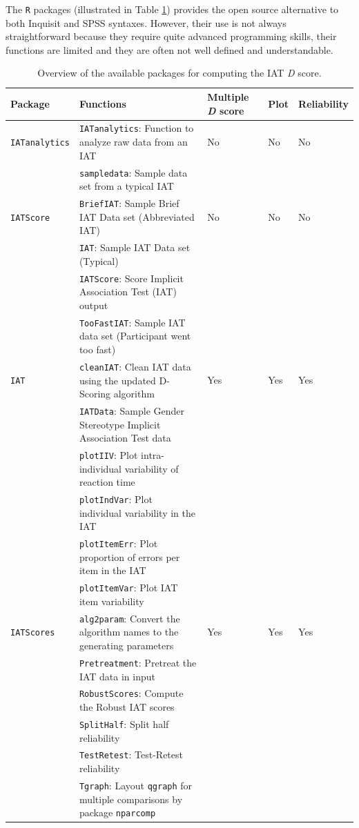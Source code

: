 \documentclass[12pt]{book}
\begin{document}
The \verb*|R| packages (illustrated in Table \ref{tab:dscorepkg}) provides the open source alternative to both Inquisit and SPSS syntaxes.  
However, their use is not always straightforward because they require quite advanced programming skills, their functions are limited and they are often not well defined and understandable.
\begin{landscape}
	\pagestyle{plain}
	\begin{longtable}{p{3cm} p{10cm} p{1.5cm} p{1.5cm} p{2cm}}
		\caption{\label{tab:dscorepkg} Overview of the available packages for computing the IAT \emph{D} score.}\\
		\toprule
		Package    &  Functions  & Multiple \emph{D} score   &    Plot   &  Reliability\\
		\midrule
		\endhead
\verb*|IATanalytics|  \cite{iatanalytics} 	&	  \verb*|IATanalytics|: Function to analyze raw data from an IAT  	&	    No    	&	    No    	&	  No\\
&	  \verb*|sampledata|: Sample data set from a typical IAT  	&	  	&	  	&	 \\
\verb*|IATScore|  \cite{iatscore}	&	  \verb*|BriefIAT|: Sample Brief IAT Data set (Abbreviated IAT)  	&	    No    	&	    No    	&	  No\\
&	  \verb*|IAT|: Sample IAT Data set (Typical) 	&	  	&	  	&	 \\
&	  \verb*|IATScore|: Score Implicit Association Test (IAT) output  	&	  	&	  	&	 \\
&	  \verb*|TooFastIAT|: Sample IAT data set (Participant went too fast)  	&	  	&	  	&	 \\
\verb*|IAT|  \cite{iat}	&	   \verb*|cleanIAT|: Clean IAT data using the updated D-Scoring algorithm 	&	    Yes    	&	  Yes  	&	  Yes\\
&	  \verb*|IATData|: Sample Gender Stereotype Implicit Association Test data  	&	  	&	  	&	 \\
&	  \verb*|plotIIV|: Plot intra-individual variability of reaction time  	&	  	&	  	&	 \\
&	  \verb*|plotIndVar|:  Plot individual variability in the IAT  	&	  	&	  	&	 \\
&	  \verb*|plotItemErr|: Plot proportion of errors per item in the IAT   	&	  	&	  	&	 \\
&	  \verb*|plotItemVar|:  Plot IAT item variability  	&	  	&	  	&	 \\
\verb*|IATScores|  	\cite{iatscores} &	  \verb*|alg2param|: Convert the algorithm names to the generating parameters 	&	    Yes    	&	    Yes    	&	  Yes\\
&	 \verb*|Pretreatment|: Pretreat the IAT data in input   	&	  	&	  	&	 \\
&	  \verb*|RobustScores|: Compute the Robust IAT scores   	&	  	&	  	&	 \\
&	  \verb*|SplitHalf|: Split half reliability   	&	  	&	  	&	 \\
&	  \verb*|TestRetest|: Test-Retest reliability   	&	  	&	  	&	 \\
&	  \verb*|Tgraph|: Layout \verb*|qgraph| for multiple comparisons by package  \verb*|nparcomp|  	&	  	&	  	&	 \\


\end{longtable}
\end{landscape}
\end{document}
